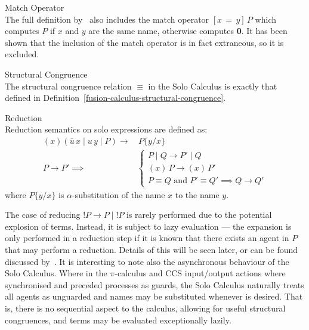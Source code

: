     \begin{remark*}{Match Operator\\}
        The full definition by~\cite{solo-calculus} also includes the match operator $[x \, = \, y] \, P$ which computes $P$ if $x$ and $y$ are the same name, otherwise computes \textbf{0}.
        It has been shown that the inclusion of the match operator is in fact extraneous, so it is excluded.
    \end{remark*}


    \begin{definition}{Structural Congruence\\}
        The structural congruence relation $\equiv$ in the Solo Calculus is exactly that defined in Definition~\ref{fusion-calculus-structural-congruence}.
    \end{definition}


    \begin{definition}{Reduction\\}
        Reduction semantics on solo expressions are defined as:
        \begin{align*}
            (x)(\bar{u} \, x \; | \; u \, y \; | \; P) \rightarrow & \, P\{y / x\} \\
            P \rightarrow P' \implies &
            \begin{cases}
                P \; | \; Q \rightarrow P' \; | \; Q \\
                (x) \, P \rightarrow (x) \, P' \\
                P \equiv Q \text{ and } P' \equiv Q' \implies Q \rightarrow Q'
            \end{cases}
        \end{align*}
        where $P\{y / x\}$ is $\alpha$-substitution of the name $x$ to the name $y$.
    \end{definition}
    The case of reducing $!P \rightarrow P \; | \; !P$ is rarely performed due to the potential explosion of terms.
    Instead, it is subject to lazy evaluation --- the expansion is only performed in a reduction step if it is known that there exists an agent in $P$ that may perform a reduction.
    Details of this will be seen later, or can be found discussed by~\cite{solo-diagrams}.
    It is interesting to note also the asynchronous behaviour of the Solo Calculus.
    Where in the $\pi$-calculus and CCS input/output actions where synchronised and preceded processes as guards, the Solo Calculus naturally treats all agents as unguarded and names may be substituted whenever is desired.
    That is, there is no sequential aspect to the calculus, allowing for useful structural congruences, and terms may be evaluated exceptionally lazily.


